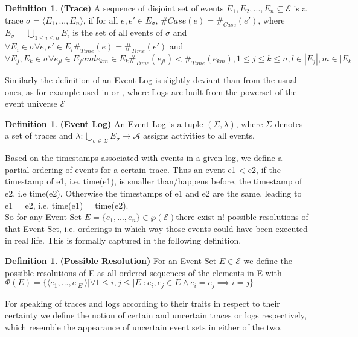 \documentclass[
	a4paper,
	pagesize,
	pdftex,
	12pt,
	ngerman,
	fleqn,
	final,
	]{scrartcl}
\theoremstyle{plain}
\theoremstyle{definition}
\newtheorem{defn}[thm]{Definition}
\begin{document}
		\begin{defn}{\textbf{(Trace)}}
			A sequence of disjoint set of events \(E_1, E_2, ... , E_n \subseteq \mathcal{E}\) is a trace \(\sigma = \langle E_1, ..., E_n \rangle\), if for all \(e, e' \in E_\sigma \), \(\#{Case}(e) = \#_{Case}(e')\), where \(E_\sigma = \bigcup_{1 \leq i \leq n} E_i\) is the set of all events of \(\sigma\) and \(\forall E_i \in \sigma \forall e, e' \in E_i \#_{Time}(e) = \#_{Time}(e')\) and \(\forall E_j, E_k \in \sigma \forall e_{jl} \in E_j and e_{km} \in E_k \#_{Time}(e_{jl}) < \#_{Time}(e_{km}), 1 \leq j \leq k \leq n, l \in |E_j|, m \in |E_k|\)
		\end{defn}
		
		Similarly the definition of an Event Log is slightly deviant than from the usual ones, as for example used in \cite{AalstWilvander2016Pm:d} or \cite{carmona2018conformance}, where Logs are built from the powerset of the event universe \(\mathcal{E}\) 
		
		\begin{defn}{\textbf{(Event Log)}}
			An Event Log is a tuple \((\Sigma, \lambda)\), where \(\Sigma\) denotes a set of traces and \(\lambda : \bigcup_{\sigma \in \Sigma} E_\sigma \rightarrow \mathcal{A}\) assigns activities to all events.  
		\end{defn}
		
		Based on the timestamps associated with events in a given log, we define a partial ordering of events for a certain trace. Thus an event e1 < e2, if the timestamp of e1, i.e. time(e1), is smaller than/happens before, the timestamp of e2, i.e time(e2). Otherwise the timestamps of e1 and e2 are the same, leading to e1 = e2, i.e. time(e1) = time(e2).\\
		So for any Event Set \(E = \{e_1, ..., e_n\} \in \wp(\mathcal{E}) \)there exist n! possible resolutions of that Event Set, i.e. orderings in which way those events could have been executed in real life. This is formally captured in the following definition. 
		
		\begin{defn}{\textbf{(Possible Resolution)}}
			For an Event Set \(E \in \mathcal{E}\) we define the possible resolutions of E as all ordered sequences of the elements in E with \(\Phi(E) = \{\langle e_1, ..., e_{|E|}\rangle | \forall 1 \leq i,j \leq |E|: e_i, e_j \in E \land e_i = e_j \implies i=j \} \)
		\end{defn}	
	
		For speaking of traces and logs according to their traits in respect to their certainty we define the notion of certain and uncertain traces or logs respectively, which resemble the appearance of uncertain event sets in either of the two.
		
\end{document}
